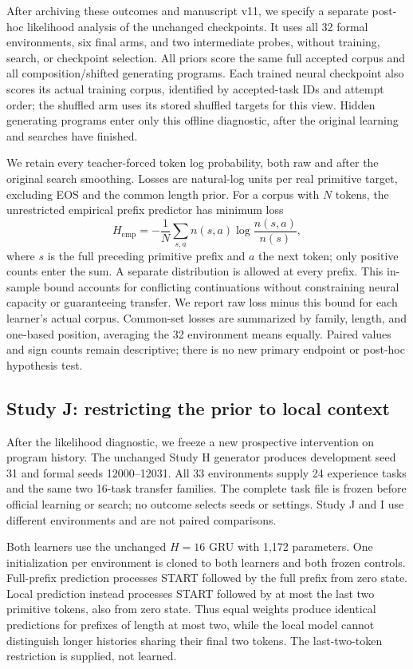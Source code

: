 \documentclass[11pt]{article}
\begin{document}
After archiving these outcomes and manuscript v11, we specify a separate
post-hoc likelihood analysis of the unchanged checkpoints. It uses all 32
formal environments, six final arms, and two intermediate probes, without
training, search, or checkpoint selection. All priors score the same full
accepted corpus and all composition/shifted generating programs. Each trained
neural checkpoint also scores its actual training corpus, identified by
accepted-task IDs and attempt order; the shuffled arm uses its stored shuffled
targets for this view. Hidden generating programs enter only this offline
diagnostic, after the original learning and searches have finished.

We retain every teacher-forced token log probability, both raw and after the
original search smoothing. Losses are natural-log units per real primitive
target, excluding EOS and the common length prior. For a corpus with $N$
tokens, the unrestricted empirical prefix predictor has minimum loss
\[
 H_{\mathrm{emp}}=-\frac{1}{N}\sum_{s,a}n(s,a)
       \log\frac{n(s,a)}{n(s)},
\]
where $s$ is the full preceding primitive prefix and $a$ the next token;
only positive counts enter the sum. A separate distribution is allowed at
every prefix. This in-sample bound accounts for conflicting continuations
without constraining neural capacity or guaranteeing transfer. We report raw
loss minus this bound for each learner's actual corpus. Common-set losses
are summarized by family, length, and one-based position, averaging the 32
environment means equally. Paired values and sign counts remain descriptive;
there is no new primary endpoint or post-hoc hypothesis test.

\subsection{Study J: restricting the prior to local context}
After the likelihood diagnostic, we freeze a new prospective intervention on
program history. The unchanged Study H generator produces development seed
31 and formal seeds 12000--12031. All 33 environments supply 24 experience
tasks and the same two 16-task transfer families. The complete task file is
frozen before official learning or search; no outcome selects seeds or settings.
Study J and I use different environments and are not paired comparisons.

Both learners use the unchanged $H=16$ GRU with 1,172 parameters. One
initialization per environment is cloned to both learners and both frozen
controls. Full-prefix prediction processes START followed by the full prefix
from zero state. Local prediction instead processes START followed by at most
the last two primitive tokens, also from zero state. Thus equal weights
produce identical predictions for prefixes of length at most two, while
the local model cannot distinguish longer histories sharing their final
two tokens. The last-two-token restriction is supplied, not learned.
\end{document}
